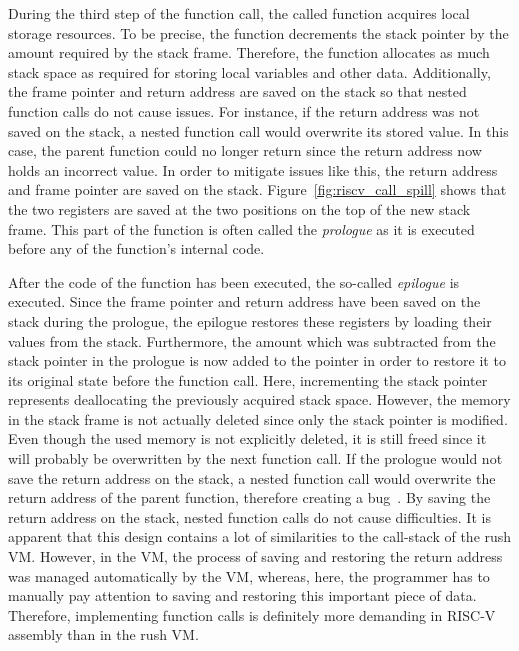 During the third step of the function call, the called function acquires local storage resources.
To be precise, the function decrements the stack pointer by the amount required by the stack frame.
Therefore, the function allocates as much stack space as required for storing local variables and other data.
Additionally, the frame pointer and return address are saved on the stack so that nested function calls do not cause issues.
For instance, if the return address was not saved on the stack, a nested function call would overwrite its stored value.
In this case, the parent function could no longer return since the return address now holds an incorrect value.
In order to mitigate issues like this, the return address and frame pointer are saved on the stack.
Figure~\ref{fig:riscv_call_spill} shows that the two registers are saved at the two positions on the top of the new stack frame.
This part of the function is often called the \emph{prologue} as it is executed before any of the function's internal code.

After the code of the function has been executed, the so-called \emph{epilogue} is executed.
Since the frame pointer and return address have been saved on the stack during the prologue,
the epilogue restores these registers by loading their values from the stack.
Furthermore, the amount which was subtracted from the stack pointer in the prologue is now added to the pointer in order to restore it to its original state before the function call.
Here, incrementing the stack pointer represents deallocating the previously acquired stack space.
However, the memory in the stack frame is not actually deleted since only the stack pointer is modified.
Even though the used memory is not explicitly deleted, it is still freed since it will probably be overwritten by the next function call.
If the prologue would not save the return address on the stack, a nested function call would overwrite the return address of the parent function, therefore creating a bug~\cite[p.~33]{Patterson2017}.
By saving the return address on the stack, nested function calls do not cause difficulties.
It is apparent that this design contains a lot of similarities to the call-stack of the rush VM\@.
However, in the VM, the process of saving and restoring the return address was managed automatically by the VM,
whereas, here, the programmer has to manually pay attention to saving and restoring this important piece of data.
Therefore, implementing function calls is definitely more demanding in RISC-V assembly than in the rush VM\@.

